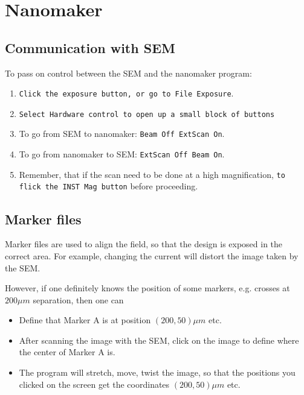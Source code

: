  \section{Nanomaker\label{sec:nanomaker}}
 \subsection{Communication with SEM}
 To pass on control between the SEM and the nanomaker program:
 
 \begin{enumerate}
 	\item \texttt{Click the exposure button, or go to File \ra Exposure}.
 	\item \texttt{Select Hardware control to open up a small block of buttons}
 	\item To go from SEM to nanomaker: \texttt{Beam Off \ra ExtScan On}.
 	\item To go from nanomaker to SEM: \texttt{ExtScan Off \ra Beam On}.
 	\item Remember, that if the scan need to be done at a high magnification, \texttt{to flick the INST Mag button} before proceeding.
 \end{enumerate}
 
 \subsection{Marker files}
 Marker files are used to align the field, so that the design is exposed in the correct area. For example, changing the current will distort the image taken by the SEM.
 
 However, if one definitely knows the position of some markers, e.g. crosses at $200\mu m$ separation, then one can
 \begin{itemize}
 	\item Define that Marker A is at position $(200,50)\mu m$ etc.
 	\item After scanning the image with the SEM, click on the image to define where the center of Marker A is.
 	\item The program will stretch, move, twist the image, so that the positions you clicked on the screen get the coordinates $(200,50)\mu m$ etc.
 \end{itemize}
 
 
